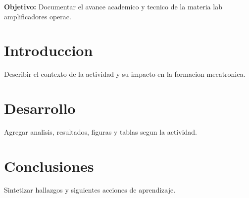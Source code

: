 \documentclass[spanish,letterpaper,oneside]{article}
\begin{document}
\templatePortrait
\templatePagecfg
\onehalfspacing

\begin{abstractd}
\textbf{Objetivo:} Documentar el avance academico y tecnico de la materia lab amplificadores operac.
\end{abstractd}

\templateIndex
\templateFinalcfg

\section{Introduccion}
Describir el contexto de la actividad y su impacto en la formacion mecatronica.

\section{Desarrollo}
Agregar analisis, resultados, figuras y tablas segun la actividad.

\section{Conclusiones}
Sintetizar hallazgos y siguientes acciones de aprendizaje.



\end{document}
